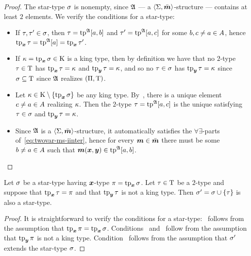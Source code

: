 \begin{proof}
The star-type $\sigma$ is nonempty, since $\mathfrak{A}$ --- a
$\left\langle \mathrm{\Sigma},\bar{\bm{m}} \right\rangle$-structure --- contains at least $2$ elements. We verify the
conditions for a star-type:
\begin{itemize}
  \item[\refstpcond1] If $\tau, {\tau'} \in \sigma$, then $\tau =
  \operatorname{tp}^{\mathfrak{A}}[a,b]$ and ${\tau'} = \operatorname{tp}^{\mathfrak{A}}[a,c]$ for some $b,c\neq a\in A$, hence
  $\operatorname{tp}_{\bm{x}}\tau = \operatorname{tp}^{\mathfrak{A}}[a] = \operatorname{tp}_{\bm{x}}{\tau'}$.
  \item[\refstpcond2] If $\kappa = \operatorname{tp}_{\bm{x}}\sigma\in\mathrm{K}$ is a king type, then by
  definition we have that no $2$-type $\tau\in\mathrm{T}$ has $\operatorname{tp}_{\bm{x}}\tau = \kappa$ and $\operatorname{tp}_{\bm{y}}\tau =
  \kappa$, and so no $\tau\in\sigma$ has $\operatorname{tp}_{\bm{y}}\tau = \kappa$ since
  $\sigma\subseteq\mathrm{T}$ since $\mathfrak{A}$ realizes $(\Pi,\mathrm{T})$.
  \item[\refstpcond3] Let $\kappa\in\mathrm{K}\setminus\left\{\operatorname{tp}_{\bm{x}}\sigma\right\}$ be any king type.
  By~, there is a unique element $c \neq a \in
  A$ realizing $\kappa$. Then the $2$-type $\tau = \operatorname{tp}^{\mathfrak{A}}[a,c]$ is the
  unique satisfying $\tau\in\sigma$ and $\operatorname{tp}_{\bm{y}}\tau = \kappa$.
  \item[\refstpcond4] Since $\mathfrak{A}$ is a $\left\langle \mathrm{\Sigma},\bar{\bm{m}} \right\rangle$-structure, it
  automatically satisfies the $\forall\exists$-parts of~\cref{eq:twovar-ms-iinter}, hence for 
  every $\bm{m} \in \bar{\bm{m}}$ there must be some $b \neq a \in A$ such that
  $\bm{m}(\bm{x},\bm{y}) \in \operatorname{tp}^{\mathfrak{A}}[a,b]$.
\end{itemize}
\end{proof}

\begin{remark}\label{rem:star-type-ext}
Let $\sigma$ be a star-type having $\bm{x}$-type $\pi = \operatorname{tp}_{\bm{x}}\sigma$.
Let $\tau \in \mathrm{T}$ be a $2$-type and suppose that $\operatorname{tp}_{\bm{x}}\tau = \pi$ and
that $\operatorname{tp}_{\bm{y}}\tau$ is not a king type.
Then ${\sigma'} = \sigma \cup \left\{\tau\right\}$ is also a star-type.
\end{remark}
\begin{proof}
It is straightforward to verify the conditions for a star-type:~
follows from the assumption that $\operatorname{tp}_{\bm{x}}\pi = \operatorname{tp}_{\bm{x}}\sigma$.
Conditions~ and~ follow from the assumption that
$\operatorname{tp}_{\bm{y}}\pi$ is not a king type.
Condition~ follows from the assumption that ${\sigma'}$ extends the
star-type $\sigma$.
\end{proof}

